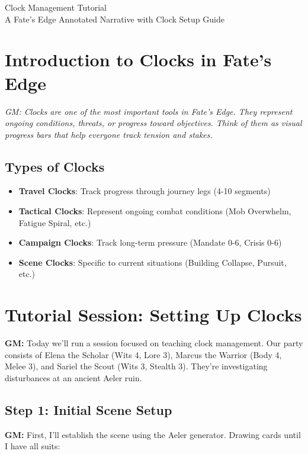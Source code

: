 \documentclass[11pt]{article}
\newcommand{\player}[1]{\textbf{#1:}}
\newcommand{\gm}[1]{\textit{GM: #1}}
\begin{document}
\begin{center}
{\LARGE Clock Management Tutorial}\\
\vspace{0.5em}
{\large A Fate's Edge Annotated Narrative with Clock Setup Guide}
\end{center}

\section*{Introduction to Clocks in Fate's Edge}

\gm{Clocks are one of the most important tools in Fate's Edge. They represent ongoing conditions, threats, or progress toward objectives. Think of them as visual progress bars that help everyone track tension and stakes.}

\subsection*{Types of Clocks}

\begin{itemize}[leftmargin=*]
\item \textbf{Travel Clocks}: Track progress through journey legs (4-10 segments)
\item \textbf{Tactical Clocks}: Represent ongoing combat conditions (Mob Overwhelm, Fatigue Spiral, etc.)
\item \textbf{Campaign Clocks}: Track long-term pressure (Mandate 0-6, Crisis 0-6)
\item \textbf{Scene Clocks}: Specific to current situations (Building Collapse, Pursuit, etc.)
\end{itemize}

\section*{Tutorial Session: Setting Up Clocks}

\player{GM} Today we'll run a session focused on teaching clock management. Our party consists of Elena the Scholar (Wits 4, Lore 3), Marcus the Warrior (Body 4, Melee 3), and Sariel the Scout (Wits 3, Stealth 3). They're investigating disturbances at an ancient Aeler ruin.

\subsection*{Step 1: Initial Scene Setup}

\player{GM} First, I'll establish the scene using the Aeler generator. Drawing cards until I have all suits:
\end{document}

